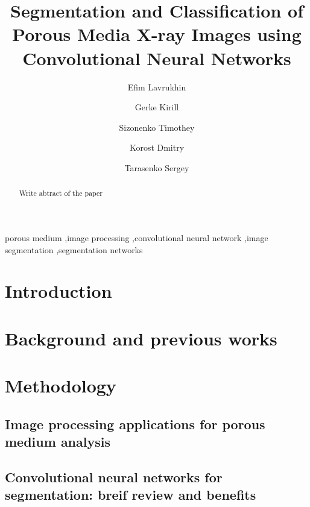 \documentclass[review]{elsarticle}
\begin{document}
\begin{frontmatter}

\title{ Segmentation and Classification of Porous Media X-ray Images using Convolutional Neural Networks}


\author{Efim Lavrukhin}

\author[mysecondaryaddress]{Gerke Kirill}

\author[mymainaddress,mysecondaryaddress]{Sizonenko Timothey}

\author[mymainaddress,mysecondaryaddress]{Korost Dmitry}

\author[tritaryaddress]{Tarasenko Sergey}

\address[mymainaddress]{Moscow, Russia}
\address[mysecondaryaddress]{Some Street}
\address[tritaryaddress]{Independent Researcher}

\begin{abstract}
Write abtract of the paper
\end{abstract}

\begin{keyword}
porous medium \sep image processing \sep convolutional neural network \sep image segmentation \sep segmentation networks
\end{keyword}

\end{frontmatter}

\linenumbers

\section{Introduction}

\section{Background and previous works}

\section{Methodology}
\subsection{Image processing applications for porous medium analysis}
\subsection{Convolutional neural networks for segmentation: breif review and benefits}
\end{document}
